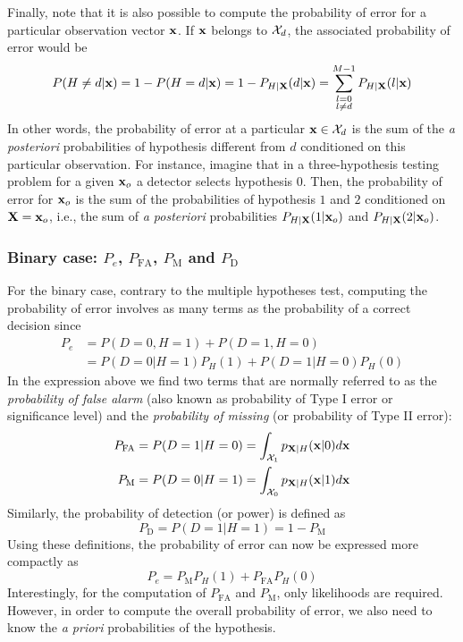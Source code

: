 Finally, note that it is also possible to compute the probability of error for a particular observation vector ${\bf x}$. If ${\bf x}$ belongs to ${\cal X}_d$, the associated probability of error would be
\begin{equation}
    P(H\neq d|{\bf x}) = 1 - P( H = d|{\bf x}) = 1 - P_{H|{\bf X}}(d|{\bf x}) = \sum_{\substack{l = 0 \\ l \neq d}}^{M-1} P_{H|{\bf X}}(l|{\bf x})
    \label{eq:Pe_x}
\end{equation}
In other words, the probability of error at a particular ${\bf x} \in {\cal X}_d$ is the sum of the {\em a posteriori} probabilities of hypothesis different from $d$ conditioned on this particular observation. For instance, imagine that in a three-hypothesis testing problem for a given ${\bf x}_o$ a detector selects hypothesis $0$. Then, the probability of error for  ${\bf x}_o$ is the sum of the probabilities of hypothesis $1$ and $2$ conditioned on ${\bf X} = {\bf x}_o$, i.e., the sum of {\em a posteriori} probabilities $P_{H|{\bf X}}(1|{\bf x}_o)$ and $P_{H|{\bf X}}(2|{\bf x}_o)$.

\subsubsection{Binary case: $P_e$, $P_\text{FA}$, $P_\text{M}$ and $P_\text{D}$}
For the binary case, contrary to the multiple hypotheses test, computing the probability of error  involves as many terms as the probability of a correct decision since
\begin{align}
    P_e & = P(D=0, H=1) + P(D=1, H=0) \nonumber \\
    & = P(D=0|H=1) P_H(1) + P(D=1|H=0) P_H(0) \nonumber
\end{align}
In the expression above we find two terms that are normally referred to as the {\em probability of false alarm} (also known as probability of Type I error or significance level) and the {\em probability of missing} (or probability of Type II error):
\begin{align}
    P_\text{FA} & = P(D=1|H=0) = \int_{{\cal X}_1} p_{{\bf X}|H}({\bf x}|0) d{\bf x} \nonumber \\
    P_\text{M} & = P(D=0|H=1) = \int_{{\cal X}_0} p_{{\bf X}|H}({\bf x}|1) d{\bf x} \nonumber
\end{align}
Similarly, the probability of detection (or power) is defined as
$$P_\text{D} = P(D=1|H=1) = 1 - P_\text{M}$$
Using these definitions, the probability of error can now be expressed more compactly as
$$P_e = P_\text{M} P_H(1) + P_\text{FA} P_H(0)$$
Interestingly, for the computation of $P_\text{FA}$ and $P_\text{M}$, only likelihoods are required. However, in order to compute the overall probability of error, we also need to know the {\em a priori} probabilities of the hypothesis.

